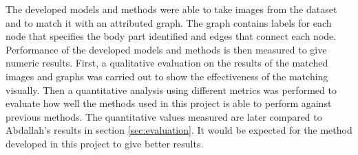 \newcommand{\fourplotall}[4] {
\begin{minipage}{0.48\textwidth}
	\centering
	#1
\end{minipage}
\hspace*{\fill}
\begin{minipage}{0.48\textwidth}
	\centering
	#2
\end{minipage}
\n
\begin{minipage}{0.48\textwidth}
	\centering
	#3
\end{minipage}
\hspace*{\fill}
\begin{minipage}{0.48\textwidth}
	\centering
	#4
\end{minipage}
}

\newcommand{\fourplot}[3]{
\begin{minipage}{0.48\textwidth}
	\centering
	#1{#2}{0.3}{#3}
\end{minipage}
\hspace*{\fill}
\begin{minipage}{0.48\textwidth}
	\centering
	#1{#2}{0.5}{#3}
\end{minipage}
\n
\begin{minipage}{0.48\textwidth}
	\centering
	#1{#2}{0.7}{#3}
\end{minipage}
\hspace*{\fill}
\begin{minipage}{0.48\textwidth}
	\centering
	#1{#2}{0.9}{#3}
\end{minipage}
}

\newcommand{\fourplotlabel}[4]{
\begin{minipage}{0.48\textwidth}
	\centering
	#1{#2}{0.3}{#3}{#4}
\end{minipage}
\hspace*{\fill}
\begin{minipage}{0.48\textwidth}
	\centering
	#1{#2}{0.5}{#3}{#4}
\end{minipage}
\n
\begin{minipage}{0.48\textwidth}
	\centering
	#1{#2}{0.7}{#3}{#4}
\end{minipage}
\hspace*{\fill}
\begin{minipage}{0.48\textwidth}
	\centering
	#1{#2}{0.9}{#3}{#4}
\end{minipage}
}


The developed models and methods were able to take images from the dataset and to match it with an attributed graph. The graph contains labels for each node that specifies the body part identified and edges that connect each node. Performance of the developed models and methods is then measured to give numeric results. First, a qualitative evaluation on the results of the matched images and graphs was carried out to show the effectiveness of the matching visually. Then a quantitative analysis using different metrics was performed to evaluate how well the methods used in this project is able to perform against previous methods. The quantitative values measured are later compared to Abdallah's results in section \ref{sec:evaluation}. It would be expected for the method developed in this project to give better results. 

